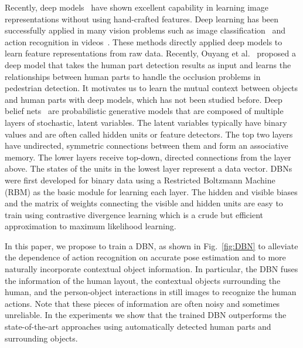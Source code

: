 \documentclass{article}
\begin{document}
Recently, deep models~\cite{Hinton06,Bengio09} have shown excellent capability in learning image representations without using hand-crafted features.  Deep learning has been successfully applied in many vision problems such as image classification~\cite{Krizhevsky12} and action recognition in videos~\cite{Ji10}.  These methods directly applied deep models to learn feature representations from raw data.  Recently, Ouyang et al.~\cite{Ouyang12} proposed a deep model that takes the human part detection results as input and learns the relationships between human parts to handle the occlusion problems in pedestrian detection.  It motivates us to learn the mutual context between objects and human parts with deep models, which has not been studied before.  Deep belief nets~\cite{Hinton06} are probabilistic generative models that are composed of multiple layers of stochastic, latent variables.  The latent variables typically have binary values and are often called hidden units or feature detectors.  The top two layers have undirected, symmetric connections between them and form an associative memory.  The lower layers receive top-down, directed connections from the layer above.  The states of the units in the lowest layer represent a data vector.  DBNs were first developed for binary data using a Restricted Boltzmann Machine (RBM) as the basic module for learning each layer.  The hidden and visible biases and the matrix of weights connecting the visible and hidden units are easy to train using contrastive divergence learning which is a crude but efficient approximation to maximum likelihood learning\cite{Hinton06}.  %

In this paper, we propose to train a DBN, as shown in Fig.~\ref{fig:DBN} to alleviate the dependence of action recognition on accurate pose estimation and to more naturally incorporate contextual object information.  In particular, the DBN fuses the information of the human layout, the contextual objects surrounding the human, and the person-object interactions in still images to recognize the human actions.  Note that these pieces of information are often noisy and sometimes unreliable.  In the experiments we show that the trained DBN outperforms the state-of-the-art approaches using automatically detected human parts and surrounding objects.
\end{document}
